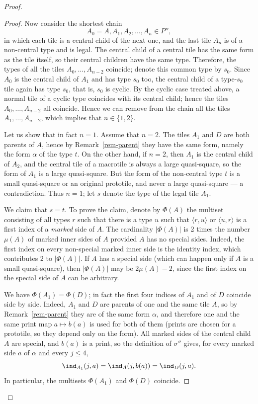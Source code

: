 \documentclass[12pt]{article}
\theoremstyle{remark}
\newcommand{\pair}[1]{\langle #1\rangle}
\newcommand{\marked}{\mu}
\begin{document}
\begin{proof}
\begin{proof}
Now consider the shortest chain
$$
A_0=A,A_1,A_2,\dots,A_n\in P'',
$$
in which each tile is a central child of the next one, and the last tile $A_n$
is of a non-central type and is legal. 
The central child of a central tile has the same form as the tile itself, so their central children
have the same type. Therefore, the types of all the tiles $A_0,\dots,A_{n-2}$ coincide; denote this common type by $s_0$.
Since $A_0$ is the central child of $A_1$ and has type $s_0$ too, the central child of a type-$s_0$ tile again has type $s_0$,
that is, $s_0$ is cyclic. By the cyclic case treated above, a normal tile of a cyclic type coincides with its central child;
hence the tiles $A_0,\dots,A_{n-2}$ all coincide.
Hence we can remove from the chain all the tiles $A_1,\dots,A_{n-2}$, which implies that
$n\in\{1,2\}$.

Let us show that in fact $n=1$. Assume that $n=2$. The tiles $A_1$ and $D$ are both parents
of $A$, hence by Remark~\ref{rem-parent} they have the same form, namely the form $\alpha$ of the
type $t$. On the other hand, if $n=2$, then $A_1$ is the central child of $A_2$, and the central
tile of a macrotile is always a large quasi-square, so the form of $A_1$ is a large quasi-square.
But the form of the non-central type $t$ is a small quasi-square or an original prototile, and
never a large quasi-square --- a contradiction. Thus $n=1$; let $s$ denote the type of the legal
tile $A_1$.

We claim that  $s=t$. To prove the claim, 
denote by $\Phi(A)$ the multiset consisting of all types $r$ such that 
there is a type $u$ such that  $\pair{r,u}$ or $\pair{u,r}$ is a first index of a \emph{marked} side of $A$.
The cardinality $|\Phi(A)|$ is 2 times the number $\marked(A)$ of marked inner sides of $A$ provided
$A$ has no special sides. Indeed, the first index on every non-special marked inner side is the identity
index, which contributes 2 to $|\Phi(A)|$. If $A$ has a special side (which can happen only if $A$ is a small quasi-square),
then $|\Phi(A)|$ may be $2\marked(A)-2$, since the first index on the special side of $A$ can be arbitrary.

We have  $\Phi(A_1)=\Phi(D)$; in fact the first four indices of $A_1$ and of $D$ coincide side by
side. Indeed, $A_1$ and $D$ are parents of one and the same tile $A$, so by
Remark~\ref{rem-parent} they are of the same form $\alpha$, and therefore one and the same print
map $a\mapsto b(a)$ is used for both of them (prints are chosen for a prototile, so they depend
only on the form). All marked sides of the central child $A$ are special, and $b(a)$ is a print, so
the definition of $\sigma''$ gives, for every marked side $a$ of $\alpha$ and every $j\le4$,
$$
\ind_{A_1}(j,a)=\ind_A(j,b(a))=\ind_D(j,a).
$$
In particular, the multisets $\Phi(A_1)$ and $\Phi(D)$ coincide.


\end{proof}
\end{proof}
\end{document}

